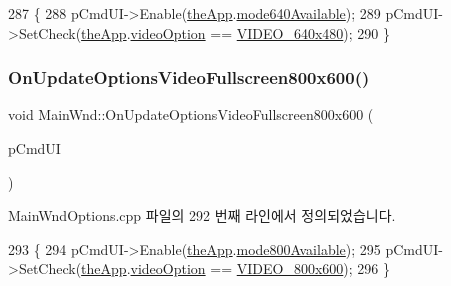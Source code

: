 \begin{DoxyCode}
287 \{
288   pCmdUI->Enable(\mbox{\hyperlink{_v_b_a_8cpp_a8095a9d06b37a7efe3723f3218ad8fb3}{theApp}}.\mbox{\hyperlink{class_v_b_a_adc44d61208b927bde7ea49c25a2e30bc}{mode640Available}});
289   pCmdUI->SetCheck(\mbox{\hyperlink{_v_b_a_8cpp_a8095a9d06b37a7efe3723f3218ad8fb3}{theApp}}.\mbox{\hyperlink{class_v_b_a_a17dac073149c897f770c00ed7098ad32}{videoOption}} == \mbox{\hyperlink{_v_b_a_8h_a531c35e38ede3ea4e5ba5afb24b29493a7ff44ba2030715f2e2b337033b5ad85e}{VIDEO\_640x480}});
290 \}
\end{DoxyCode}
\mbox{\label{class_main_wnd_ac7f87e2d41aa1674be4489729c87526c}} 
\subsubsection{\texorpdfstring{On\+Update\+Options\+Video\+Fullscreen800x600()}{OnUpdateOptionsVideoFullscreen800x600()}}
{\footnotesize\ttfamily void Main\+Wnd\+::\+On\+Update\+Options\+Video\+Fullscreen800x600 (\begin{DoxyParamCaption}\item[{C\+Cmd\+UI $\ast$}]{p\+Cmd\+UI }\end{DoxyParamCaption})\hspace{0.3cm}{\ttfamily [protected]}}



Main\+Wnd\+Options.\+cpp 파일의 292 번째 라인에서 정의되었습니다.


\begin{DoxyCode}
293 \{
294   pCmdUI->Enable(\mbox{\hyperlink{_v_b_a_8cpp_a8095a9d06b37a7efe3723f3218ad8fb3}{theApp}}.\mbox{\hyperlink{class_v_b_a_a3e2e940c6531daba73473c51a9916574}{mode800Available}});
295   pCmdUI->SetCheck(\mbox{\hyperlink{_v_b_a_8cpp_a8095a9d06b37a7efe3723f3218ad8fb3}{theApp}}.\mbox{\hyperlink{class_v_b_a_a17dac073149c897f770c00ed7098ad32}{videoOption}} == \mbox{\hyperlink{_v_b_a_8h_a531c35e38ede3ea4e5ba5afb24b29493a1849e033b4567855b2eaba899ed43c17}{VIDEO\_800x600}});
296 \}
\end{DoxyCode}
\mbox{\label{class_main_wnd_a7556a5adf4120d6c9561f21e4a9fea82}} 
